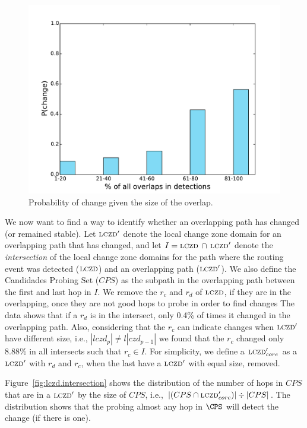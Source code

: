 \begin{figure}
\begin{center}
\includegraphics[width=0.8\columnwidth]{figs/patching/probchange.pdf}
\caption{Probability of change given the size of the overlap. }
\label{fig:overlap.change.prob}
\end{center}
%
\end{figure}
%

We now want to find a way to identify whether an overlapping path
has changed (or remained stable).  Let $\mathrm{\textsc{lczd}}'$ denote the local
change zone domain for an overlapping path that has changed, and let
$I = \mathrm{\textsc{lczd}}\,\cap\,\mathrm{\textsc{lczd}}'$ denote the \emph{intersection} of the
local change zone domains for the path where the routing event was
detected ($\mathrm{\textsc{lczd}}$) and an overlapping path ($\mathrm{\textsc{lczd}}'$).
We also define the Candidades Probing Set ($CPS$) as the subpath 
in the overlapping path between the first and last hop in $I$.
We remove the $r_c$ and $r_d$ of $\mathrm{\textsc{lczd}}$, if they are in the overlapping,
once they are not good hops to probe in order to find changes
The data shows that if a $r_d$ is in the intersect, only 0.4\% of times
it changed in the overlapping path. Also, considering that the $r_c$ can
indicate changes when $\mathrm{\textsc{lczd}}'$ have different size, i.e., $|lczd_{p}| \ne l|czd_{p-1}| $ 
we found that the $r_c$ changed only 8.88\% in all intersects such that $r_c \in I$.
For simplicity, we define a $\mathrm{\textsc{lczd}}'_{core}$ as a $\mathrm{\textsc{lczd}}'$ with $r_d$ and $r_c$,
when the last have a $\mathrm{\textsc{lczd}}'$ with equal size, removed.


Figure~\ref{fig:lczd.intersection} shows the distribution of the
number of hops in $CPS$ that are in a $\mathrm{\textsc{lczd}}'$ by the
size of $CPS$,
i.e., $|(CPS \cap \mathrm{\textsc{lczd}}'_{core})| \div |CPS|$.  The distribution shows that the
probing almost any hop in
$\CPS$ will detect the change (if there is one). 


